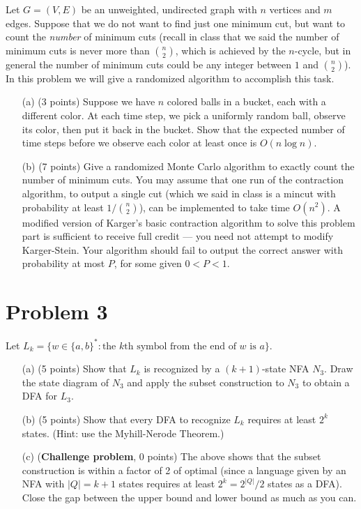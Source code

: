 \documentclass[12pt]{article}
\begin{document}
Let $G = (V,E)$ be an unweighted, undirected graph with $n$ vertices and $m$ edges. Suppose that we do not want to find just one minimum cut, but want to count the {\em number} of minimum cuts (recall in class that we said the number of minimum cuts is never more than $\binom{n}{2}$, which is achieved by the $n$-cycle, but in general the number of minimum cuts could be any integer between $1$ and $\binom{n}{2}$). In this problem we will give a randomized algorithm to accomplish this task.
\begin{itemize}
\item[(a)] (3 points) Suppose we have $n$ colored balls in a bucket, each with a different color. At each time step, we pick a uniformly random ball, observe its color, then put it back in the bucket. Show that the expected number of time steps before we observe each color at least once is $O(n\log n)$.
\item[(b)] (7 points) Give a randomized Monte Carlo algorithm to exactly count the number of minimum cuts. You may assume that one run of the contraction algorithm, to output a single cut (which we said in class is a mincut with probability at least $1/\binom{n}{2}$), can be implemented to take time $O(n^2)$. A modified version of Karger's basic contraction algorithm to solve this problem part is sufficient to receive full credit --- you need not attempt to modify Karger-Stein. Your algorithm should fail to output the correct answer with probability at most $P$, for some given $0 < P < 1$.
\end{itemize}

\section*{Problem 3}

Let $L_k = \{w\in \{a,b\}^* : \mbox{the $k$th symbol from the end of $w$ is $a$}\}$.

\begin{enumerate}
\item[(a)] (5 points) Show that $L_k$ is recognized by a $(k+1)$-state NFA $N_3$.  Draw the state diagram of $N_3$ and apply the subset construction to $N_3$ to obtain a DFA for $L_3$.

\item[(b)] (5 points) Show that every DFA to recognize $L_k$ requires at least $2^k$ states. (Hint: use the Myhill-Nerode Theorem.)

\item[(c)] (\textbf{Challenge problem}, 0 points) The above shows that the subset construction is within a factor of 2 of optimal (since a language given by an NFA with $|Q|=k+1$ states requires at least $2^k=2^{|Q|}/2$ states as a DFA).  Close the gap between the upper bound and lower bound as much as you can.
\end{enumerate}
\end{document}
